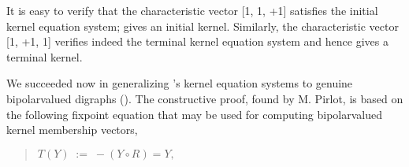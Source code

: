 \documentclass[a4paper,10pt,english]{sphinxhowto}
\begin{document}
\begin{sphinxVerbatim}[commandchars=\\\{\},numbers=left,firstnumber=1,stepnumber=1]
\end{sphinxVerbatim}

It is easy to verify that the characteristic vector {[}\sphinxhyphen{}1, \sphinxhyphen{}1, +1{]} satisfies the initial kernel equation system;  gives an initial kernel. Similarly, the characteristic vector {[}\sphinxhyphen{}1, +1, \sphinxhyphen{}1{]} verifies indeed the terminal kernel equation system and hence  gives a terminal kernel.

We succeeded now in generalizing ’s kernel equation systems to genuine bipolar\sphinxhyphen{}valued digraphs (). The constructive proof, found by M. Pirlot, is based on the following fixpoint equation that may be used for computing bipolar\sphinxhyphen{}valued kernel membership vectors,
\begin{quote}

\(T(Y) \; := \; -(Y \circ R) = Y,\)
\end{quote}
\end{document}
